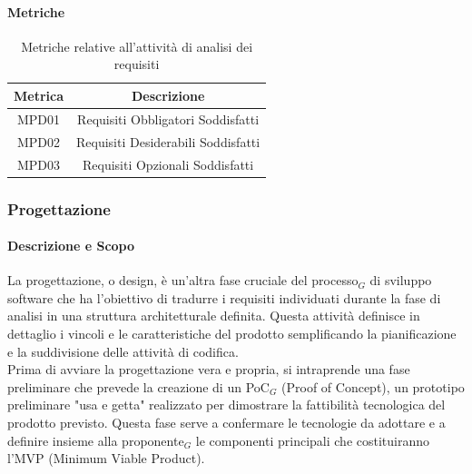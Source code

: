 \documentclass[10pt]{article}
\begin{document}
\begin{justify}
        \paragraph{Metriche}
        \begin{table}[H]
          \centering
          \begin{tabular}{|c|c|}
            \hline
            \textbf{Metrica} & \textbf{Descrizione} \\
            \hline
            MPD01 & Requisiti Obbligatori Soddisfatti\\
            \hline
            MPD02 & Requisiti Desiderabili Soddisfatti\\
            \hline
            MPD03 & Requisiti Opzionali Soddisfatti\\
            \hline
          \end{tabular}
          \caption{Metriche relative all'attività di analisi dei requisiti}
        \end{table}

    \subsubsection{Progettazione}
    \label{progettazione}
        \paragraph{Descrizione e Scopo}
        La progettazione, o design, è un'altra fase cruciale del processo$_G$ di sviluppo software che ha l'obiettivo di tradurre i requisiti individuati durante la fase di analisi in una struttura architetturale definita. Questa attività definisce in dettaglio i vincoli e le caratteristiche del prodotto semplificando la pianificazione e la suddivisione delle attività di codifica.\\
        Prima di avviare la progettazione vera e propria, si intraprende una fase preliminare che prevede la creazione di un PoC$_G$ (Proof of Concept), un prototipo preliminare "usa e getta" realizzato per dimostrare la fattibilità tecnologica del prodotto previsto. Questa fase serve a confermare le tecnologie da adottare e a definire insieme alla proponente$_G$ le componenti principali che costituiranno l'MVP (Minimum Viable Product).\\


\end{justify}
\end{document}

